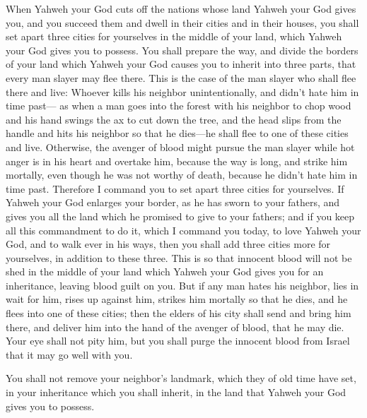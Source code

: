  When Yahweh your God cuts off the nations whose land
Yahweh your God gives you, and you succeed them and dwell in their
cities and in their houses,  you shall set apart three
cities for yourselves in the middle of your land, which Yahweh your God
gives you to possess.  You shall prepare the way, and
divide the borders of your land which Yahweh your God causes you to
inherit into three parts, that every man slayer may flee there.
 This is the case of the man slayer who shall flee there
and live: Whoever kills his neighbor unintentionally, and didn't hate
him in time past---  as when a man goes into the forest
with his neighbor to chop wood and his hand swings the ax to cut down
the tree, and the head slips from the handle and hits his neighbor so
that he dies---he shall flee to one of these cities and live.
 Otherwise, the avenger of blood might pursue the man
slayer while hot anger is in his heart and overtake him, because the way
is long, and strike him mortally, even though he was not worthy of
death, because he didn't hate him in time past.  Therefore
I command you to set apart three cities for yourselves. 
If Yahweh your God enlarges your border, as he has sworn to your
fathers, and gives you all the land which he promised to give to your
fathers;  and if you keep all this commandment to do it,
which I command you today, to love Yahweh your God, and to walk ever in
his ways, then you shall add three cities more for yourselves, in
addition to these three.  This is so that innocent blood
will not be shed in the middle of your land which Yahweh your God gives
you for an inheritance, leaving blood guilt on you.  But
if any man hates his neighbor, lies in wait for him, rises up against
him, strikes him mortally so that he dies, and he flees into one of
these cities;  then the elders of his city shall send and
bring him there, and deliver him into the hand of the avenger of blood,
that he may die.  Your eye shall not pity him, but you
shall purge the innocent blood from Israel that it may go well with you.

 You shall not remove your neighbor's landmark, which
they of old time have set, in your inheritance which you shall inherit,
in the land that Yahweh your God gives you to possess.

